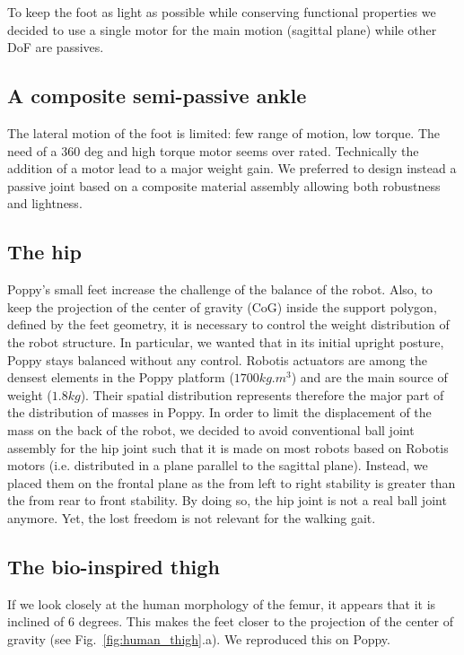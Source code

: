 To keep the foot as light as possible while conserving functional properties we decided to use a single motor for the main motion (sagittal plane) while other DoF are passives.

\subsection{A composite semi-passive ankle} %
The lateral motion of the foot is limited: few range of motion, low torque.
The need of a 360 deg and high torque motor seems over rated.
Technically the addition of a motor lead to a major weight gain.
We preferred to design  instead a passive joint based on a composite material assembly allowing both robustness and lightness.


\subsection{The hip} %
Poppy's small feet increase the challenge of the balance of the robot.
Also, to keep the projection of the center of gravity (CoG) inside the support polygon, defined by the feet geometry, it is necessary to control the weight distribution of the robot structure.
In particular, we wanted that in its initial upright posture, Poppy stays balanced without any control.
 Robotis actuators are among the densest elements in the Poppy platform ($ 1700 kg.m^{3} $) and are the main source of weight ($1.8 kg$).
 Their spatial distribution represents therefore the major part of the distribution of masses in Poppy.
In order to limit the displacement of the mass on the back of the robot, we decided to avoid conventional ball joint assembly for the hip joint such that it is made on most robots based on Robotis motors (i.e.
distributed in a plane parallel to the sagittal plane).
Instead, we placed them on the frontal plane as the from left to right stability is greater than the from rear to front stability.
By doing so, the hip joint is not a real ball joint anymore.
Yet, the lost freedom is not relevant for the walking gait.

\subsection{The bio-inspired thigh} %
If we look closely at the human morphology of the femur, it appears that it is inclined of 6 degrees.
This makes the feet closer to the projection of the center of gravity (see Fig.~\ref{fig:human_thigh}.a).
We reproduced this on Poppy.


